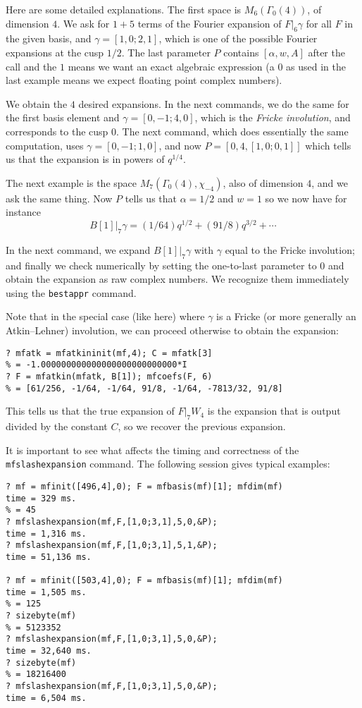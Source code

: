 \documentclass[11pt]{article}
\newcommand{\al}{\alpha}
\newcommand{\ga}{\gamma}
\newcommand{\G}{\Gamma}
\def\kbd#1{{\tt #1}}
\begin{document}
Here are some detailed explanations. The first space is $M_6(\G_0(4))$,
of dimension $4$. We ask for $1+5$ terms of the Fourier expansion of
$F|_6\ga$ for all $F$ in the given basis, and $\ga=[1,0;2,1]$, which is one
of the possible Fourier expansions at the cusp $1/2$. The last parameter
$P$ contains $[\al,w,A]$ after the call and the $1$ means we want an exact
algebraic expression (a $0$ as used in the last example means we expect
floating point complex numbers).

We obtain the $4$ desired expansions. In the next commands, we do the same
for the first basis element and $\ga=[0,-1;4,0]$, which is the
\emph{Fricke involution}, and corresponds to the cusp $0$. The next
command, which does essentially the same computation, uses $\ga=[0,-1;1,0]$,
and now $P=[0,4, [1,0;0,1]]$ which tells us that the expansion is in powers of
$q^{1/4}$.

The next example is the space $M_7(\G_0(4),\chi_{-4})$, also of
dimension $4$, and we ask the same thing. Now $P$ tells us that $\al = 1/2$
and $w = 1$ so we now have for instance
$$B[1]|_7\ga = (1/64)q^{1/2} + (91/8)q^{3/2}+\cdots$$

In the next command, we expand $B[1]|_7\ga$ with $\ga$ equal to the Fricke
involution; and finally we check numerically by setting the one-to-last
parameter to $0$ and obtain the expansion as raw complex numbers. We
recognize them immediately using the \kbd{bestappr} command.

Note that in the special case (like here) where $\ga$ is a Fricke (or more
generally an Atkin--Lehner) involution, we can proceed otherwise to obtain
the expansion:

\begin{verbatim}
? mfatk = mfatkininit(mf,4); C = mfatk[3]
% = -1.000000000000000000000000000*I
? F = mfatkin(mfatk, B[1]); mfcoefs(F, 6)
% = [61/256, -1/64, -1/64, 91/8, -1/64, -7813/32, 91/8]
\end{verbatim}

This tells us that the true expansion of $F|_7W_4$ is the expansion that
is output divided by the constant $C$, so we recover the previous
expansion.

\smallskip

It is important to see what affects the timing and correctness of the
\kbd{mfslashexpansion} command. The following session gives typical examples:

\begin{verbatim}
? mf = mfinit([496,4],0); F = mfbasis(mf)[1]; mfdim(mf)
time = 329 ms.
% = 45
? mfslashexpansion(mf,F,[1,0;3,1],5,0,&P);
time = 1,316 ms.
? mfslashexpansion(mf,F,[1,0;3,1],5,1,&P);
time = 51,136 ms.

? mf = mfinit([503,4],0); F = mfbasis(mf)[1]; mfdim(mf)
time = 1,505 ms.
% = 125
? sizebyte(mf)
% = 5123352
? mfslashexpansion(mf,F,[1,0;3,1],5,0,&P);
time = 32,640 ms.
? sizebyte(mf)
% = 18216400
? mfslashexpansion(mf,F,[1,0;3,1],5,0,&P);
time = 6,504 ms.
\end{verbatim}
\end{document}
